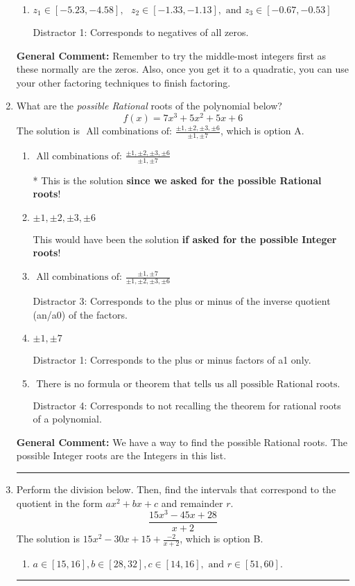 \documentclass{extbook}[14pt]
\newcommand{\litem}[1]{\item #1

\rule{\textwidth}{0.4pt}}
\begin{document}
\begin{enumerate}
{\begin{enumerate}[label=\Alph*.]
 Distractor 4: Corresponds to moving factors from one rational to another.
\item \( z_1 \in [-5.23, -4.58], \text{   }  z_2 \in [-1.33, -1.13], \text{   and   } z_3 \in [-0.67, -0.53] \)

 Distractor 1: Corresponds to negatives of all zeros.
\end{enumerate}

\textbf{General Comment:} Remember to try the middle-most integers first as these normally are the zeros. Also, once you get it to a quadratic, you can use your other factoring techniques to finish factoring.
}
\litem{
What are the \textit{possible Rational} roots of the polynomial below?
\[ f(x) = 7x^{3} +5 x^{2} +5 x + 6 \]The solution is \( \text{ All combinations of: }\frac{\pm 1,\pm 2,\pm 3,\pm 6}{\pm 1,\pm 7} \), which is option A.\begin{enumerate}[label=\Alph*.]
\item \( \text{ All combinations of: }\frac{\pm 1,\pm 2,\pm 3,\pm 6}{\pm 1,\pm 7} \)

* This is the solution \textbf{since we asked for the possible Rational roots}!
\item \( \pm 1,\pm 2,\pm 3,\pm 6 \)

This would have been the solution \textbf{if asked for the possible Integer roots}!
\item \( \text{ All combinations of: }\frac{\pm 1,\pm 7}{\pm 1,\pm 2,\pm 3,\pm 6} \)

 Distractor 3: Corresponds to the plus or minus of the inverse quotient (an/a0) of the factors. 
\item \( \pm 1,\pm 7 \)

 Distractor 1: Corresponds to the plus or minus factors of a1 only.
\item \( \text{ There is no formula or theorem that tells us all possible Rational roots.} \)

 Distractor 4: Corresponds to not recalling the theorem for rational roots of a polynomial.
\end{enumerate}

\textbf{General Comment:} We have a way to find the possible Rational roots. The possible Integer roots are the Integers in this list.
}
\litem{
Perform the division below. Then, find the intervals that correspond to the quotient in the form $ax^2+bx+c$ and remainder $r$.
\[ \frac{15x^{3} -45 x + 28}{x + 2} \]The solution is \( 15x^{2} -30 x + 15 + \frac{-2}{x + 2} \), which is option B.\begin{enumerate}[label=\Alph*.]
\item \( a \in [15, 16], b \in [28, 32], c \in [14, 16], \text{ and } r \in [51, 60]. \)


\end{enumerate}}
\end{enumerate}
\end{document}
